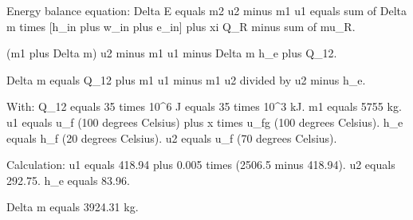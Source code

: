 Energy balance equation:  
Delta E equals m2 u2 minus m1 u1 equals sum of Delta m times [h_in plus w_in plus e_in] plus xi Q_R minus sum of mu_R.  

(m1 plus Delta m) u2 minus m1 u1 minus Delta m h_e plus Q_12.  

Delta m equals Q_12 plus m1 u1 minus m1 u2 divided by u2 minus h_e.  

With:  
Q_12 equals 35 times 10^6 J equals 35 times 10^3 kJ.  
m1 equals 5755 kg.  
u1 equals u_f (100 degrees Celsius) plus x times u_fg (100 degrees Celsius).  
h_e equals h_f (20 degrees Celsius).  
u2 equals u_f (70 degrees Celsius).  

Calculation:  
u1 equals 418.94 plus 0.005 times (2506.5 minus 418.94).  
u2 equals 292.75.  
h_e equals 83.96.  

Delta m equals 3924.31 kg.